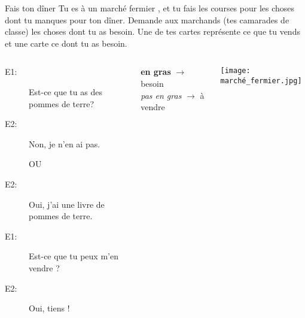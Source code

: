 \begin{frame}{Fais ton dîner}
  Tu es à un marché fermier , et tu fais les courses pour les choses dont tu manques pour ton dîner.
  Demande aux marchands (tes camarades de classe) les choses dont tu as besoin.
  Une de tes cartes représente ce que tu vends et une carte ce dont tu as besoin.
  \begin{columns}
      \small
      \begin{description}
        \item[E1:] Est-ce que tu as des pommes de terre?
        \item[E2:] Non, je n'en ai pas.
        \item[] OU
        \item[E2:] Oui, j'ai une livre de pommes de terre.
        \item[E1:] Est-ce que tu peux m'en vendre ?
        \item[E2:] Oui, tiens !
      \end{description}
      \textbf{en gras} $\to$ besoin \\ \emph{pas en gras} $\to$ à vendre
      \begin{center}
        \texttt{[image: marché\_fermier.jpg]}
      \end{center}
  \end{columns}
\end{frame}